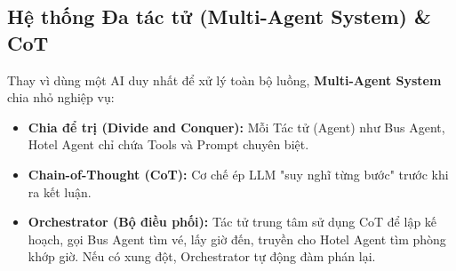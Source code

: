 \subsection{Hệ thống Đa tác tử (Multi-Agent System) \& CoT}
Thay vì dùng một AI duy nhất để xử lý toàn bộ luồng, \textbf{Multi-Agent System} chia nhỏ nghiệp vụ:
\begin{itemize}
    \item \textbf{Chia để trị (Divide and Conquer):} Mỗi Tác tử (Agent) như Bus Agent, Hotel Agent chỉ chứa Tools và Prompt chuyên biệt.
    \item \textbf{Chain-of-Thought (CoT):} Cơ chế ép LLM "suy nghĩ từng bước" trước khi ra kết luận.
    \item \textbf{Orchestrator (Bộ điều phối):} Tác tử trung tâm sử dụng CoT để lập kế hoạch, gọi Bus Agent tìm vé, lấy giờ đến, truyền cho Hotel Agent tìm phòng khớp giờ. Nếu có xung đột, Orchestrator tự động đàm phán lại.
\end{itemize}
